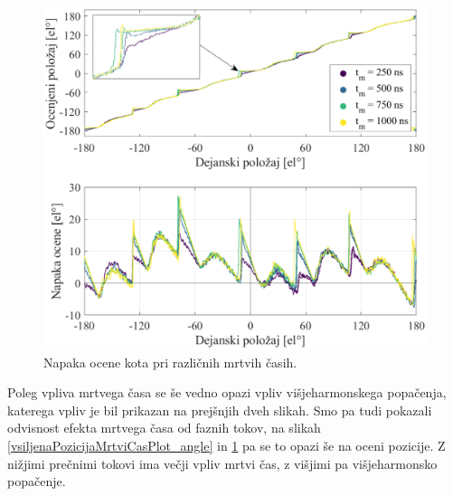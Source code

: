 \documentclass[a4paper,twoside,openright,12pt,slovene]{book}
\begin{document}
\begin{figure}[!htbp]
    \centering
    \includegraphics[width=1.05\columnwidth]{Slike/vsiljenaPozicijaMrtviCasPlot_angleError.eps}
    \caption{\label{vsiljenaPozicijaMrtviCasPlot_angleError} Napaka ocene kota pri različnih mrtvih časih. }
\end{figure}

\newpage
Poleg vpliva mrtvega časa se še vedno opazi vpliv višjeharmonskega popačenja, katerega vpliv je bil prikazan na prejšnjih dveh slikah. Smo pa tudi pokazali odvisnost efekta mrtvega časa od faznih
tokov, na slikah \ref{vsiljenaPozicijaMrtviCasPlot_angle} in \ref{vsiljenaPozicijaMrtviCasPlot_angleError} pa se to opazi še na oceni pozicije. Z nižjimi prečnimi tokovi ima večji vpliv mrtvi čas, z
višjimi pa višjeharmonsko popačenje.

\end{document}
